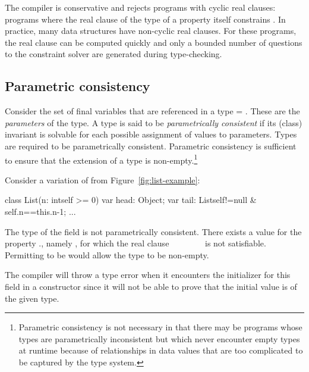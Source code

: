 The \Xten{} compiler is conservative and rejects
programs with cyclic real clauses: programs where the real
clause of the type
of a property  itself constrains .
%
%
In practice, many data structures have non-cyclic real clauses.
For these programs, the real clause can be computed quickly and
only a bounded number of questions to the constraint solver are
generated during type-checking.


\subsection{Parametric consistency}

Consider the set of final variables that are referenced in a type
 = . These are the {\em parameters} of the type. A
type is said to be {\em parametrically consistent} if its
(class)
invariant
 is solvable for each possible assignment of values to
parameters.  Types are required to be parametrically
consistent. Parametric consistency is sufficient to ensure that the
extension of a type is non-empty.\footnote{Parametric
consistency is not necessary in that
there may be programs whose types are parametrically inconsistent
but which never encounter empty types at runtime because of
relationships in data values that are too complicated to be captured by
the type system.}

Consider a variation of  from Figure~\ref{fig:list-example}:
\begin{xten}
class List(n: int{self >= 0}) {
  var head: Object;
  var tail: List{self!=null &
                 self.n==this.n-1};
  ...
}
\end{xten}
The type of the field  is not parametrically
consistent. There exists a value for the property ., namely
, for which the real clause ~\xcd{!=}~ \xcd{&}
~\xcd{==}~ \xcd{&}
~\xcd{>=}~ is not satisfiable.  Permitting
 to be  would allow the type to be non-empty.

The compiler will throw a type error when it encounters the
initializer for this field in a constructor since it will not be able
to prove that the initial value is of the given type.


